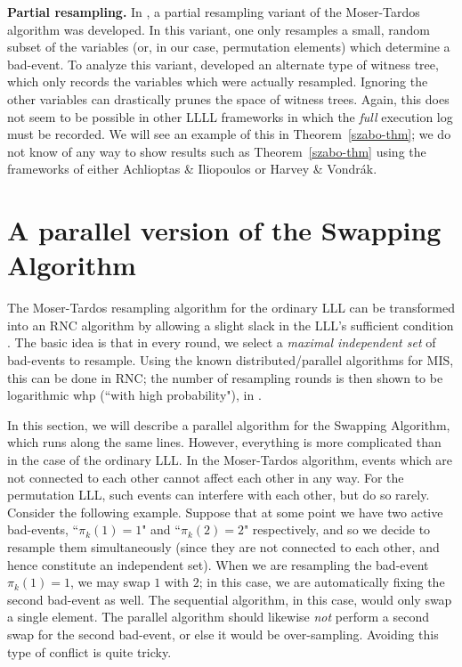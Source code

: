 \textbf{Partial resampling.} In \cite{harris-srin2}, a partial resampling variant of the Moser-Tardos algorithm was developed. In this variant, one only resamples a small, random subset of the variables (or, in our case, permutation elements) which determine a bad-event. To analyze this variant, \cite{harris-srin2} developed an alternate type of witness tree, which only records the variables which were actually resampled. Ignoring the other variables can drastically prunes the space of witness trees. Again, this does not seem to be possible in other LLLL frameworks in which the \emph{full} execution log must be recorded. We will see an example of this in Theorem~\ref{szabo-thm}; we do not know of any way to show results such as Theorem~\ref{szabo-thm} using the frameworks of either Achlioptas \& Iliopoulos or Harvey \& Vondr\'{a}k.

\section{A parallel version of the Swapping Algorithm}
\label{sec:parallel}
The Moser-Tardos resampling algorithm for the ordinary LLL can be transformed into an RNC algorithm by allowing a slight slack in the LLL's sufficient condition \cite{moser-tardos}. The basic idea is that in every round, we select a \emph{maximal independent set} of bad-events to resample. Using the known distributed/parallel algorithms for MIS, this can be done in RNC; the number of resampling rounds is then shown to be logarithmic whp (``with high probability"), in 
\cite{moser-tardos}.

In this section, we will describe a parallel algorithm for the Swapping Algorithm, which runs along the same lines. However, everything is more complicated than in the case of the ordinary LLL. In the Moser-Tardos algorithm, events which are not connected to each other cannot affect each other in any way. For the permutation LLL, such events can interfere with each other, but do so rarely. Consider the following example. 
Suppose that at some point we have two active bad-events, ``$\pi_k(1) = 1$" and
``$\pi_k(2) = 2$" respectively, and so we decide to resample them simultaneously (since they are not
connected to each other, and hence constitute an independent set).
When we are resampling the bad-event $\pi_k(1) = 1$, we may swap $1$ with $2$; in this case, we are automatically fixing the second bad-event as well. The sequential algorithm, in this case, would only swap a single element. The parallel algorithm should likewise \emph{not} perform a second swap for the second bad-event, or else it would be over-sampling. Avoiding this type of conflict is quite tricky.

